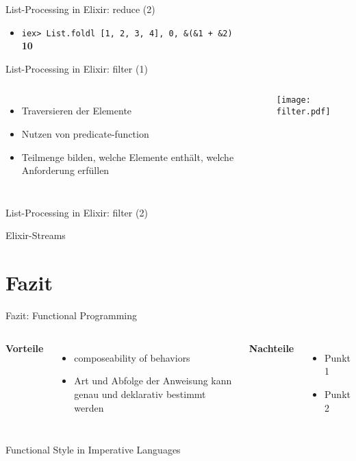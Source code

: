 \documentclass[compress]{beamer}
\begin{document}
  \begin{frame}{List-Processing in Elixir: reduce (2)}
    \begin{itemize}[<+->]
      \item \texttt{iex> List.foldl [1, 2, 3, 4], 0, \&(\&1 + \&2)} \\
            \textbf{10}
    \end{itemize}
  \end{frame}

  \begin{frame}{List-Processing in Elixir: filter (1)}
    \begin{columns}[c]
      \begin{itemize}
        \item Traversieren der Elemente
        \item Nutzen von predicate-function
        \item Teilmenge bilden, welche Elemente enthält, welche Anforderung erfüllen
      \end{itemize}
    \texttt{[image: filter.pdf]}
    \end{columns}
  \end{frame}

  \begin{frame}{List-Processing in Elixir: filter (2)}
  \end{frame}

  \begin{frame}{Elixir-Streams}
  \end{frame}

\section{Fazit}
  \begin{frame}{Fazit: Functional Programming}
    \begin{columns}[c]
      \textbf{Vorteile}
      \begin{itemize}
        \item composeability of behaviors
        \item Art und Abfolge der Anweisung kann genau und deklarativ bestimmt werden
      \end{itemize}
      \textbf{Nachteile}
      \begin{itemize}
        \item Punkt 1
        \item Punkt 2
      \end{itemize}
    \end{columns}
  \end{frame}

  \begin{frame}{Functional Style in Imperative Languages}
  \end{frame}
\end{document}
